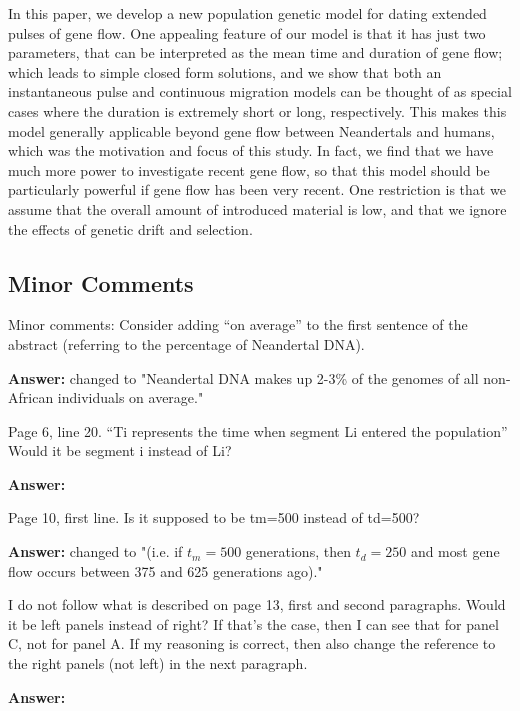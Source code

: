 \documentclass[11pt]{article}
\begin{document}
\begin{mdframed}[hidealllines=true,backgroundcolor=grey!20]
In this paper, we develop a new population genetic model for dating extended pulses of gene flow. One appealing feature of our model is that it has just two parameters, that can be interpreted as the mean time and duration of gene flow; which leads to simple closed form solutions, and we show that both an instantaneous pulse and continuous migration models can be thought of as special cases where the duration is extremely short or long, respectively. This makes this model generally applicable beyond gene flow between Neandertals and humans, which was the motivation and focus of this study. In fact, we find that we have much more power to investigate recent gene flow, so that this model should be particularly powerful if gene flow has been very recent. One restriction is that we assume that the overall amount of introduced material is low, and that we ignore the effects of genetic drift and selection.\end{mdframed}



\subsection{Minor Comments}\label{Minor Comments}

Minor comments:
Consider adding “on average” to the first sentence of the abstract (referring to the percentage of Neandertal DNA).

\textbf{Answer:} changed to "Neandertal DNA makes up 2-3\% of the genomes of all non-African individuals on average."

Page 6, line 20. “Ti represents the time when segment Li entered the population” Would it be segment i instead of Li? 

\textbf{Answer:}

Page 10, first line. Is it supposed to be tm=500 instead of td=500?

\textbf{Answer:} changed to "(i.e. if $t_m= 500$ generations, then $t_d = 250$ and most gene flow occurs between  375 and 625
generations ago)."


I do not follow what is described on page 13, first and second paragraphs. Would it be left panels instead of right? If that’s the case, then I can see that for panel C, not for panel A. If my reasoning is correct, then also change the reference to the right panels (not left) in the next paragraph.

\textbf{Answer:} 
\end{document}
